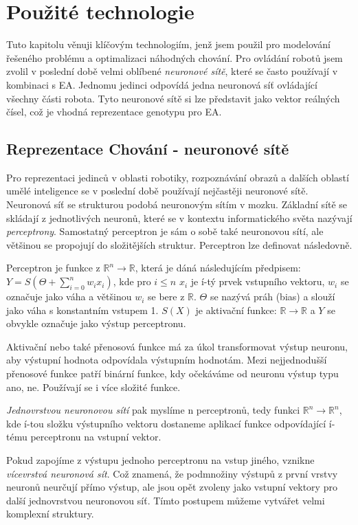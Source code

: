 \section{Použité technologie}
Tuto kapitolu věnuji klíčovým technologiím, jenž jsem použil pro modelování řešeného problému a optimalizaci náhodných chování. Pro ovládání robotů jsem zvolil v poslední době velmi oblíbené \textit{neuronové sítě}, které se často používají v kombinaci s EA. Jednomu jedinci odpovídá jedna neuronová síť ovládající všechny části robota. Tyto neuronové sítě si lze představit jako vektor reálných čísel, což je vhodná reprezentace genotypu pro EA. 
\subsection*{Reprezentace Chování - neuronové sítě}
Pro reprezentaci jedinců v oblasti robotiky, rozpoznávání obrazů a dalších oblastí umělé inteligence se v poslední době používají nejčastěji neuronové sítě. Neuronová síť se strukturou podobá neuronovým sítím v mozku. Základní sítě se skládají z jednotlivých neuronů, které se v kontextu informatického světa nazývají \textit{perceptrony}. Samostatný perceptron je sám o sobě také neuronovou sítí, ale většinou se propojují do složitějších struktur. Perceptron lze definovat následovně.
\begin{definice}[Perceptron] Perceptron je funkce z $\mathbb{R}^n \rightarrow \mathbb{R}$, která je dáná následujícím předpisem: 	$Y = S(\Theta + \sum_{i=0}^{n} w_i x_i)$, kde pro $i \leq n$ $x_{i}$ je í-tý prvek vstupního vektoru, $w_{i}$ se označuje jako váha a většinou $w_{i} $ se bere z $\mathbb{R}$.  $\Theta$ se nazývá práh (bias) a slouží jako váha s konstantním vstupem 1.  $S(X)$ je aktivační funkce: $\mathbb{R} \rightarrow \mathbb{R}$ a $Y$ se obvykle označuje jako výstup perceptronu.
\end{definice}
Aktivační nebo také přenosová funkce má za úkol transformovat výstup neuronu, aby výstupní hodnota odpovídala výstupním hodnotám. Mezi nejjednodušší přenosové funkce patří binární funkce, kdy očekáváme od neuronu výstup typu ano, ne. Používají se i více složité funkce.
\par
\textit{Jednovrstvou neuronovou sítí} pak myslíme n perceptronů, tedy funkci $\mathbb{R}^{n} \rightarrow \mathbb{R}^{n}$, kde $í$-tou složku výstupního vektoru dostaneme aplikací funkce odpovídající $í$-tému perceptronu na vstupní vektor.
\par
Pokud zapojíme z výstupu jednoho perceptronu na vstup jiného, vznikne \textit{vícevrstvá neuronová sít}. Což znamená, že podmnožiny výstupů z první vrstvy neuronů neurčují přímo výstup, ale jsou opět zvoleny jako vstupní vektory pro další jednovrstvou neuronovou síť. Tímto postupem můžeme vytvářet velmi komplexní struktury.
